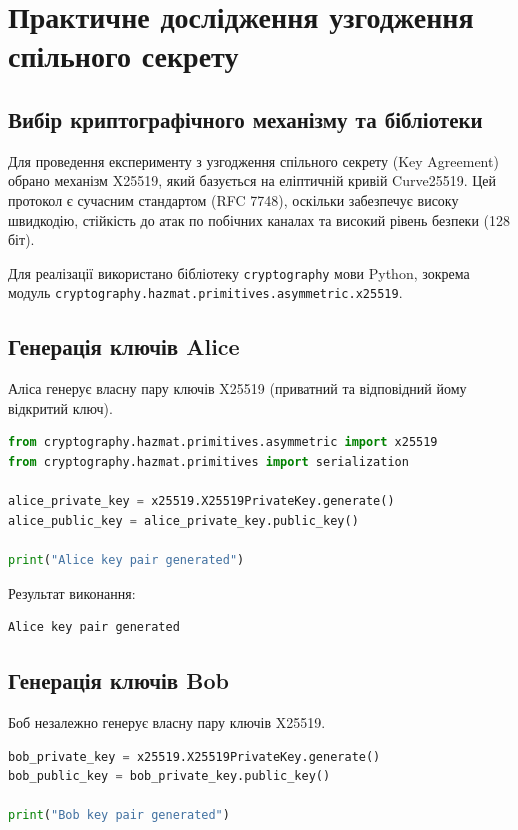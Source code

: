 \section{Практичне дослідження узгодження спільного секрету}

\subsection{Вибір криптографічного механізму та бібліотеки}
Для проведення експерименту з узгодження спільного секрету (Key Agreement) обрано механізм X25519,
який базується на еліптичній кривій Curve25519. Цей протокол є сучасним стандартом (RFC 7748), оскільки
забезпечує високу швидкодію, стійкість до атак по побічних каналах та високий рівень безпеки (128 біт). 

Для реалізації використано бібліотеку \texttt{cryptography} мови Python, зокрема модуль
\texttt{cryptography.hazmat.primitives.asymmetric.x25519}.

\subsection{Генерація ключів Alice}
Аліса генерує власну пару ключів X25519 (приватний та відповідний йому відкритий ключ).

\begin{lstlisting}[language=Python]
from cryptography.hazmat.primitives.asymmetric import x25519
from cryptography.hazmat.primitives import serialization

alice_private_key = x25519.X25519PrivateKey.generate()
alice_public_key = alice_private_key.public_key()

print("Alice key pair generated")
\end{lstlisting}

Результат виконання:
\begin{lstlisting}
Alice key pair generated
\end{lstlisting}

\subsection{Генерація ключів Bob}
Боб незалежно генерує власну пару ключів X25519.

\begin{lstlisting}[language=Python]
bob_private_key = x25519.X25519PrivateKey.generate()
bob_public_key = bob_private_key.public_key()

print("Bob key pair generated")
\end{lstlisting}

